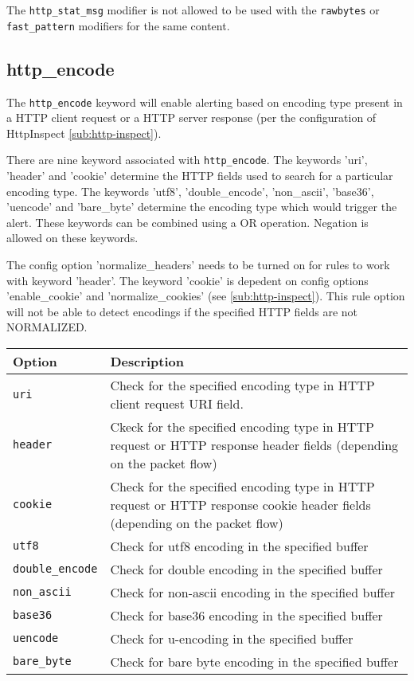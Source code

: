 \documentclass[english]{report}
\newenvironment{note}{
\samepage
    \vspace{10pt}{\textsf{
        {\hspace{7pt}\Huge{$\triangle$\hspace{-12.5pt}{\Large{$^!$}}}}\hspace{5pt}
        {\Large{NOTE}}
    }
    }
   \begin{center}
    \par\vspace{-17pt}

    \begin{lrbox}{\savepar}
    \begin{minipage}[r]{6in}
}
{
    \end{minipage}
    \end{lrbox}
    \fbox{
        \usebox{
            \savepar
	}
    }
    \par\vskip10pt
    \end{center}
}
\newenvironment{note}{
        \begin{rawhtml}
        <p><table border="1"><tr><td><b>
        Note:&nbsp;&nbsp;</b>
        \end{rawhtml}
}{
        \begin{rawhtml}
        </b></td></tr></table></p>
        \end{rawhtml}
}
\begin{document}
\begin{note}

The \texttt{http\_stat\_msg} modifier is not allowed to be used with the
\texttt{rawbytes} or \texttt{fast\_pattern} modifiers for the same content.

\end{note}

\subsection{http\_encode}
\label{sub:HttpEncode}

The \texttt{http\_encode} keyword will enable alerting based on encoding type present
in a HTTP client request or a HTTP server response (per the configuration of 
HttpInspect \ref{sub:http-inspect}).

There are nine keyword associated with \texttt{http\_encode}. The keywords 'uri', 'header' 
and 'cookie' determine the HTTP fields used to search for a particular encoding type.
The keywords 'utf8', 'double\_encode', 'non\_ascii', 'base36', 'uencode' and 'bare\_byte' 
determine the encoding type which would trigger the alert. These keywords can be combined 
using a OR operation. Negation is allowed on these keywords.

The config option 'normalize\_headers' needs to be turned on for rules to work with keyword 'header'.
The keyword 'cookie' is depedent on config options 'enable\_cookie' and 'normalize\_cookies' (see
\ref{sub:http-inspect}).  This rule option will not be able to detect encodings if the specified 
HTTP fields are not NORMALIZED.

\begin{tabular}{| l | p{4.5in} |}
\hline
{\bf Option} & {\bf Description}\\
\hline
\hline
\texttt{uri} & Check for the specified encoding type in HTTP client request URI field.\\
\hline
\texttt{header} & Ckeck for the specified encoding type in HTTP request or HTTP response header fields
(depending on the packet flow)\\
\hline
\texttt{cookie} & Check for the specified encoding type in HTTP request or HTTP response cookie 
header fields (depending on the packet flow)\\
\hline
\texttt{utf8} & Check for utf8 encoding in the specified buffer\\
\hline
\texttt{double\_encode} & Check for double encoding in the specified buffer\\
\hline
\texttt{non\_ascii} & Check for non-ascii encoding in the specified buffer\\
\hline
\texttt{base36} & Check for base36 encoding in the specified buffer\\
\hline
\texttt{uencode} & Check for u-encoding in the specified buffer\\
\hline
\texttt{bare\_byte} & Check for bare byte encoding in the specified buffer\\
\hline
\end{tabular}
\end{document}
